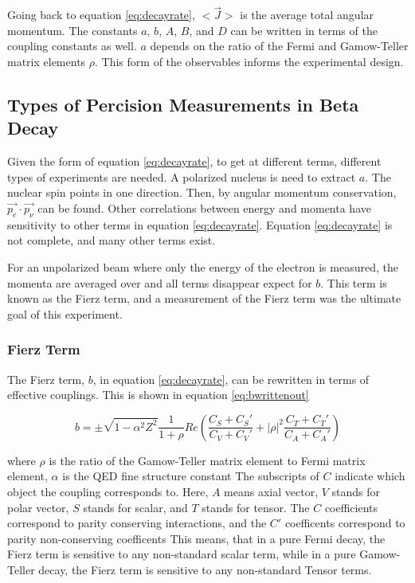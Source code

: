 \documentclass[main.tex]{subfiles}
\begin{document}
Going back to equation \ref{eq:decayrate}, $<\vec{J}>$ is the average total angular momentum. 
The constants $a$, $b$, $A$, $B$, and $D$ can be written in terms of the coupling constants as well.
$a$ depends on the ratio of the Fermi and Gamow-Teller matrix elements $\rho$.
This form of the observables informs the experimental design. 

\subsection{Types of Percision Measurements in Beta Decay}
Given the form of equation \ref{eq:decayrate}, to get at different terms, different types of experiments are needed.
A polarized nucleus is need to extract $a$. 
The nuclear spin points in one direction. 
Then, by angular momentum conservation, $\vec{p_{e}} \cdot \vec{p_{\nu}}$ can be found.
Other correlations between energy and momenta have sensitivity to other terms in equation \ref{eq:decayrate}.
Equation \ref{eq:decayrate} is not complete, and many other terms exist. 

For an unpolarized beam where only the energy of the electron is measured, the momenta are averaged over and all terms disappear expect for $b$.
This term is known as the Fierz term, and a measurement of the Fierz term was the ultimate goal of this experiment. 

\subsubsection{Fierz Term}
The Fierz term, $b$, in equation \ref{eq:decayrate}, can be rewritten in terms of effective couplings.
This is shown in equation \ref{eq:bwrittenout}

\begin{equation}
	b =  \pm \sqrt{1 - \alpha^{2}{Z^{2}}}\frac{1}{1 + \rho}Re(\frac{C_{S} + C_{S}'}{C_{V} + C_{V}'} + |\rho|^{2}\frac{C_{T} + C_{T}'}{C_{A} + C_{A}'})
	\label{eq:bwrittenout}
\end{equation}

where $\rho$ is the ratio of the Gamow-Teller matrix element to Fermi matrix element, $\alpha$ is the QED fine structure constant \cite{Gon19}
The subscripts of $C$ indicate which object the coupling corresponds to. 
Here, $A$ means axial vector, $V$ stands for polar vector, $S$ stands for scalar, and $T$ stands for tensor. 
The $C$ coefficients correspond to parity conserving interactions, and the $C'$ coefficents correspond to parity non-conserving coefficents \cite{Lee56}
This means, that in a pure Fermi decay, the Fierz term is sensitive to any non-standard scalar term, while in a pure Gamow-Teller decay, the Fierz term is sensitive to any non-standard Tensor terms. 
\end{document}
